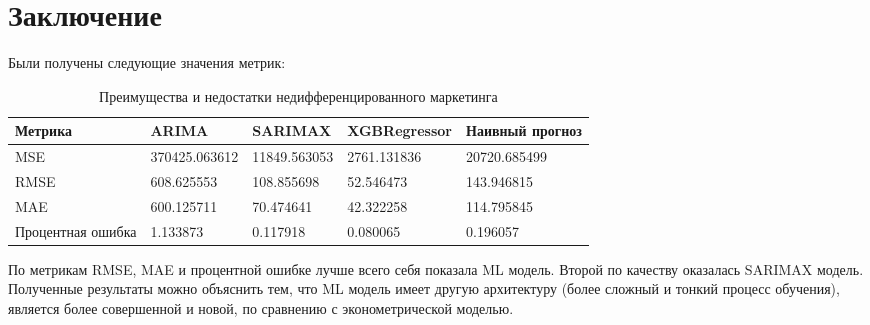 \documentclass[10pt,a4paper]{article}
\begin{document}
\section{Заключение}

 Были получены следующие значения метрик:


\begin{table}[h]
	\centering
	\caption{Преимущества и недостатки недифференцированного маркетинга}
	\begin{tabularx}{\textwidth}{|X|X|X|X|X|}
		\hline
		Метрика & ARIMA & SARIMAX & XGBRegressor & Наивный прогноз \\
		\hline
		MSE & 370425.063612 & 11849.563053 & 2761.131836 & 20720.685499 \\
		RMSE & 608.625553 & 108.855698 & 52.546473 & 143.946815 \\
		MAE & 600.125711 & 70.474641 & 42.322258 & 114.795845 \\
		Процентная ошибка & 1.133873 & 0.117918 & 0.080065 & 0.196057 \\
		\hline
	\end{tabularx}
\end{table}



По метрикам RMSE, MAE и процентной ошибке лучше всего себя показала ML модель. Второй по качеству оказалась SARIMAX модель. Полученные результаты можно объяснить тем, что ML модель имеет другую архитектуру (более сложный и тонкий процесс обучения), является более совершенной и новой, по сравнению с эконометрической моделью.
	
	
\end{document}
